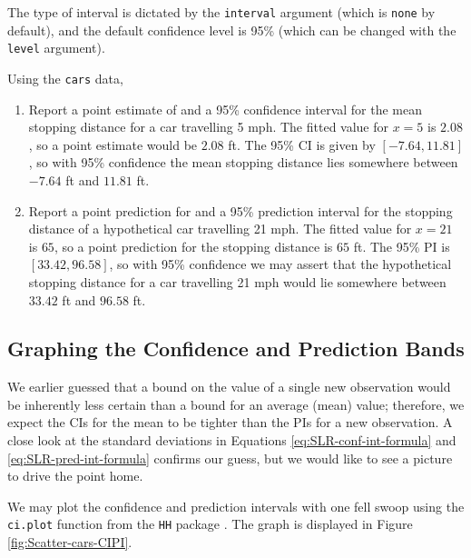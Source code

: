 \documentclass[captions=tableheading]{scrbook}
\begin{document}
The type of interval is dictated by the \texttt{interval} argument (which is \texttt{none} by default), and the default confidence level is 95\% (which can be changed with the \texttt{level} argument). 

\begin{example}
Using the \texttt{cars} data,
\begin{enumerate}
\item Report a point estimate of and a 95\% confidence interval for the mean stopping distance for a car travelling 5 mph.
   The fitted value for \(x=5\) is \(  2.08 \), so a point estimate would be \(  2.08 \) ft. The 95\% CI is given by \( [  -7.64,  11.81 ] \), so with 95\% confidence the mean stopping distance lies somewhere between \(  -7.64 \) ft and \(  11.81 \) ft.
\item Report a point prediction for and a 95\% prediction interval for the stopping distance of a hypothetical car travelling 21 mph.
   The fitted value for \(x = 21\) is \(  65 \), so a point prediction for the stopping distance is \(  65 \) ft. The 95\% PI is \( [  33.42,  96.58 ] \), so with 95\% confidence we may assert that the hypothetical stopping distance for a car travelling 21 mph would lie somewhere between \(  33.42 \) ft and \(  96.58 \) ft.
\end{enumerate}
\end{example}
\subsection{Graphing the Confidence and Prediction Bands}
\label{sec-1-2-6}


We earlier guessed that a bound on the value of a single new observation would be inherently less certain than a bound for an average (mean) value; therefore, we expect the CIs for the mean to be tighter than the PIs for a new observation. A close look at the standard deviations in Equations \ref{eq:SLR-conf-int-formula} and \ref{eq:SLR-pred-int-formula} confirms our guess, but we would like to see a picture to drive the point home.

We may plot the confidence and prediction intervals with one fell swoop using the \texttt{ci.plot} function from the \texttt{HH} package \cite{Heibergerhh}. The graph is displayed in Figure \ref{fig:Scatter-cars-CIPI}.
\end{document}
